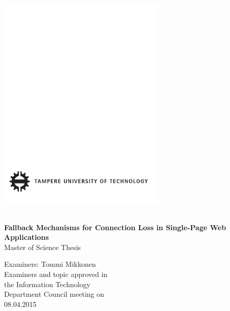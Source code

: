 \thispagestyle{empty}
 
\vspace*{-.5cm}\noindent
 
\includegraphics[width=8cm]{assets/tut-logo}
 
\vspace{6.8cm}
 
\\
{\bf\large \textsf{Fallback Mechanisms for Connection Loss in Single-Page Web Applications}}\\
\textsf{Master of Science Thesis}
 
\vspace{6.7cm} %
 
\begin{flushright}
  
\begin{minipage}[c]{6.8cm}
\begin{spacing}{1.0}
\textsf{Examiners: Tommi Mikkonen}\\
\textsf{Examiners and topic approved in}\\ 
\textsf{the Information Technology}\\
\textsf{Department Council meeting on}\\
\textsf{08.04.2015}\\
\end{spacing}
\end{minipage}
\end{flushright}



